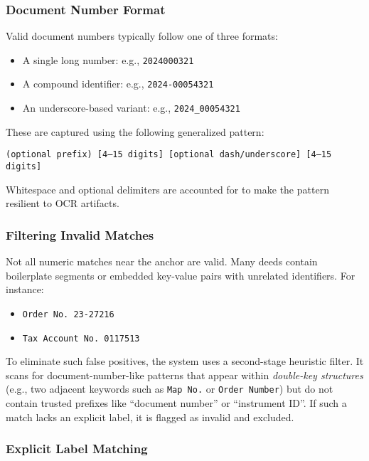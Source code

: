 \documentclass{article}
\begin{document}
\subsubsection{Document Number Format}

Valid document numbers typically follow one of three formats:

\begin{itemize}
    \item A single long number: e.g., \texttt{2024000321}
    \item A compound identifier: e.g., \texttt{2024-00054321}
    \item An underscore-based variant: e.g., \texttt{2024\_00054321}
\end{itemize}

These are captured using the following generalized pattern:

\begin{center}
\texttt{(optional prefix) [4–15 digits] [optional dash/underscore] [4–15 digits]}
\end{center}

Whitespace and optional delimiters are accounted for to make the pattern resilient to OCR artifacts.

\subsubsection{Filtering Invalid Matches}

Not all numeric matches near the anchor are valid. Many deeds contain boilerplate segments or embedded key-value pairs with unrelated identifiers. For instance:

\begin{itemize}
    \item \texttt{Order No. 23-27216}
    \item \texttt{Tax Account No. 0117513}
\end{itemize}

To eliminate such false positives, the system uses a second-stage heuristic filter. It scans for document-number-like patterns that appear within \textit{double-key structures} (e.g., two adjacent keywords such as \texttt{Map No.} or \texttt{Order Number}) but do not contain trusted prefixes like ``document number'' or ``instrument ID''. If such a match lacks an explicit label, it is flagged as invalid and excluded.

\subsubsection{Explicit Label Matching}
\end{document}
